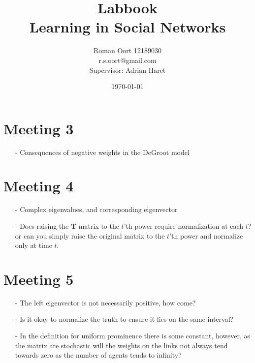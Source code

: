 \documentclass{article}
\title{Labbook \\ Learning in Social Networks}
\author{Roman Oort 12189030\\ r.s.oort@gmail.com\\[1cm]{\normal Supervisor: Adrian Haret}}
\date{\today}
\begin{document}
\section{Meeting 3}
\begin{itemize}
    \item[-] Consequences of negative weights in the DeGroot model
\end{itemize}

\section{Meeting 4}
\begin{itemize}
    \item[-] Complex eigenvalues, and corresponding eigenvector
    \item[-] Does raising the $\textbf{T}$ matrix to the $t$'th power require normalization at each $t$? or can you simply raise the original matrix to the $t$'th power and normalize only at time $t$.
\end{itemize}

\section{Meeting 5}
\begin{itemize}
    \item[-] The left eigenvector is not necessarily positive, how come?
    \item[-] Is it okay to normalize the truth to ensure it lies on the same interval?
    \item[-] In the definition for uniform prominence there is some constant, however, as the matrix are stochastic will the weights on the links not always tend towards zero as the number of agents tends to infinity?
\end{itemize}
\end{document}
